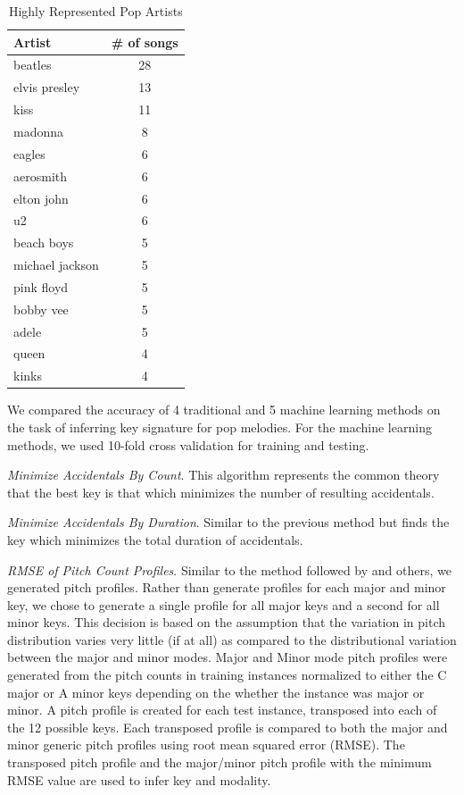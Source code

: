 \documentclass[letterpaper]{article}
\begin{document}
\begin{table}[]
\centering
\caption{Highly Represented Pop Artists}
\label{tab:data_summary}
\begin{tabular}{@{}lc@{}}
\toprule
Artist & \# of songs\\ \midrule
beatles	& 28 \\
elvis presley	& 13 \\
kiss	&	11 \\
madonna	&	8 \\
eagles	&	6 \\
aerosmith	&	6 \\
elton john	&	6 \\
u2	&	6 \\
beach boys	&	5 \\
michael jackson	&	5 \\
pink floyd	&	5 \\
bobby vee		&	5 \\
adele	&	5 \\
queen	&	4 \\
kinks		&	4 \\
\end{tabular}
\end{table}

We compared the accuracy of 4 traditional and 5 machine learning methods on the task of inferring key signature for pop melodies. For the machine learning methods, we used 10-fold cross validation for training and testing.

\emph{Minimize Accidentals By Count}. This algorithm represents the common theory that the best key is that which minimizes the number of resulting accidentals.

\emph{Minimize Accidentals By Duration}. Similar to the previous method but finds the key which minimizes the total duration of accidentals.

\emph{RMSE of Pitch Count Profiles}. Similar to the method followed by \cite{krumhansl2001cognitive} and others, we generated pitch profiles. Rather than generate profiles for each major and minor key, we chose to generate a single profile for all major keys and a second for all minor keys. This decision is based on the assumption that the variation in pitch distribution varies very little (if at all) as compared to the distributional variation between the major and minor modes. Major and Minor mode pitch profiles were generated from the pitch counts in training instances normalized to either the C major or A minor keys depending on the whether the instance was major or minor. A pitch profile is created for each test instance, transposed into each of the 12 possible keys. Each transposed profile is compared to both the major and minor generic pitch profiles using root mean squared error (RMSE). The transposed pitch profile and the major/minor pitch profile with the minimum RMSE value are used to infer key and modality.
\end{document}
